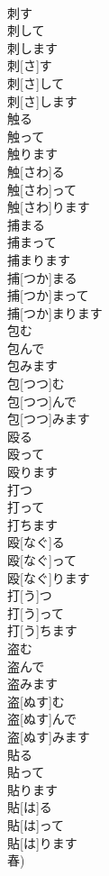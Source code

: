 \documentclass[8pt]{extreport}
\begin{document}
\begin{CJK}{UTF8}{min}
\\	刺す 
\\	刺して 
\\	刺します	
\\	刺[さ]す 
\\	刺[さ]して 
\\	刺[さ]します	
\\	触る 
\\	触って 
\\	触ります	
\\	触[さわ]る 
\\	触[さわ]って 
\\	触[さわ]ります	
\\	捕まる 
\\	捕まって 
\\	捕まります	
\\	捕[つか]まる 
\\	捕[つか]まって 
\\	捕[つか]まります	
\\	包む 
\\	包んで 
\\	包みます	
\\	包[つつ]む 
\\	包[つつ]んで 
\\	包[つつ]みます	
\\	殴る 
\\	殴って 
\\	殴ります 
\\	打つ 
\\	打って 
\\	打ちます	
\\	殴[なぐ]る 
\\	殴[なぐ]って 
\\	殴[なぐ]ります 
\\	打[う]つ 
\\	打[う]って 
\\	打[う]ちます	
\\	盗む 
\\	盗んで 
\\	盗みます	
\\	盗[ぬす]む 
\\	盗[ぬす]んで 
\\	盗[ぬす]みます	
\\	貼る 
\\	貼って 
\\	貼ります	
\\	貼[は]る 
\\	貼[は]って 
\\	貼[は]ります 
\\	春)	

\end{CJK}
\end{document}
